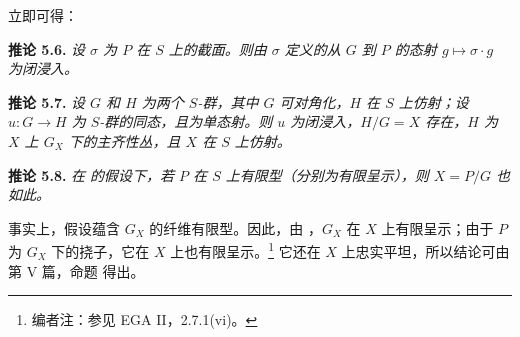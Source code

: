 立即可得：

\medskip
\noindent{}\textbf{推论 5.6.}
\textit{设 \(\sigma\) 为 \(P\) 在 \(S\) 上的截面。则由 \(\sigma\) 定义的从 \(G\) 到 \(P\) 的态射 \(g\mapsto\sigma\cdot g\) 为闭浸入。}

\medskip
\noindent{}\textbf{推论 5.7.}
\textit{设 \(G\) 和 \(H\) 为两个 \(S\)-群，其中 \(G\) 可对角化，\(H\) 在 \(S\) 上仿射；设 \(u:G\to H\) 为 \(S\)-群的同态，且为单态射。则 \(u\) 为闭浸入，\(H/G=X\) 存在，\(H\) 为 \(X\) 上 \(G_X\) 下的主齐性丛，且 \(X\) 在 \(S\) 上仿射。}

\medskip
\noindent{}\textbf{推论 5.8.}
\textit{在  的假设下，若 \(P\) 在 \(S\) 上有限型（分别为有限呈示），则 \(X=P/G\) 也如此。}

事实上，假设蕴含 \(G_X\) 的纤维有限型。因此，由 ，\(G_X\) 在 \(X\) 上有限呈示；由于 \(P\) 为 \(G_X\) 下的挠子，它在 \(X\) 上也有限呈示。\footnote{编者注：参见 EGA II，2.7.1(vi)。}
它还在 \(X\) 上忠实平坦，所以结论可由第 V 篇，命题  得出。
